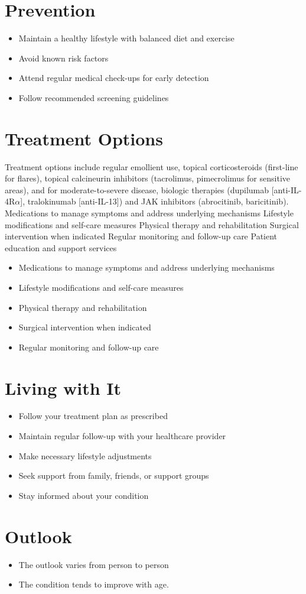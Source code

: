 \section{Prevention}
\begin{itemize}[noitemsep]
  \item Maintain a healthy lifestyle with balanced diet and exercise
  \item Avoid known risk factors
  \item Attend regular medical check-ups for early detection
  \item Follow recommended screening guidelines
\end{itemize}
\section{Treatment Options}
Treatment options include regular emollient use, topical corticosteroids (first-line for flares), topical calcineurin inhibitors (tacrolimus, pimecrolimus for sensitive areas), and for moderate-to-severe disease, biologic therapies (dupilumab [anti-IL-4R$\alpha$], tralokinumab [anti-IL-13]) and JAK inhibitors (abrocitinib, baricitinib). Medications to manage symptoms and address underlying mechanisms Lifestyle modifications and self-care measures Physical therapy and rehabilitation Surgical intervention when indicated Regular monitoring and follow-up care Patient education and support services

\begin{itemize}[noitemsep]
  \item Medications to manage symptoms and address underlying mechanisms
  \item Lifestyle modifications and self-care measures
  \item Physical therapy and rehabilitation
  \item Surgical intervention when indicated
  \item Regular monitoring and follow-up care
\end{itemize}
\section{Living with It}
\begin{itemize}[noitemsep]
  \item Follow your treatment plan as prescribed
  \item Maintain regular follow-up with your healthcare provider
  \item Make necessary lifestyle adjustments
  \item Seek support from family, friends, or support groups
  \item Stay informed about your condition
\end{itemize}
\section{Outlook}
\begin{itemize}[noitemsep]
  \item The outlook varies from person to person
  \item The condition tends to improve with age.
\end{itemize}
